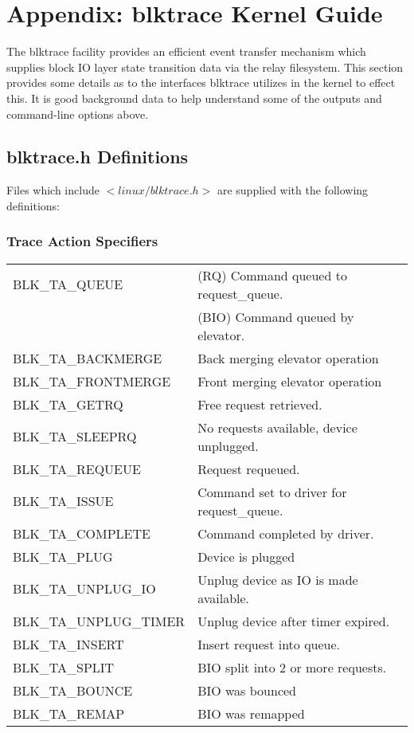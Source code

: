 \documentclass{article}
\begin{document}
\newpage
\newpage\section*{\label{sec:blktrace-kg}Appendix: blktrace Kernel Guide}

The blktrace facility provides an efficient event transfer mechanism which
supplies block IO layer state transition data via the relay
filesystem. This section provides some details as to the interfaces
blktrace utilizes in the kernel to effect this. It is good background data
to help understand some of the outputs and command-line options above.

\subsection{blktrace.h Definitions}
Files which include $<linux/blktrace.h>$ are supplied with the following
definitions:

\subsubsection{Trace Action Specifiers}
\begin{tabular}{|l|l|}\hline
  BLK\_TA\_QUEUE & (RQ) Command queued to request\_queue. \\
                 & (BIO) Command queued by elevator. \\ \hline
  BLK\_TA\_BACKMERGE & Back merging elevator operation \\ \hline
  BLK\_TA\_FRONTMERGE & Front merging elevator operation \\ \hline
  BLK\_TA\_GETRQ & Free request retrieved. \\ \hline
  BLK\_TA\_SLEEPRQ & No requests available, device unplugged. \\ \hline
  BLK\_TA\_REQUEUE & Request requeued. \\ \hline
  BLK\_TA\_ISSUE & Command set to driver for request\_queue. \\ \hline
  BLK\_TA\_COMPLETE & Command completed by driver. \\ \hline
  BLK\_TA\_PLUG & Device is plugged \\ \hline
  BLK\_TA\_UNPLUG\_IO & Unplug device as IO is made available. \\ \hline
  BLK\_TA\_UNPLUG\_TIMER & Unplug device after timer expired. \\ \hline
  BLK\_TA\_INSERT & Insert request into queue. \\ \hline
  BLK\_TA\_SPLIT & BIO split into 2 or more requests. \\ \hline
  BLK\_TA\_BOUNCE & BIO was bounced \\ \hline
  BLK\_TA\_REMAP & BIO was remapped \\ \hline
\end{tabular}
\end{document}
